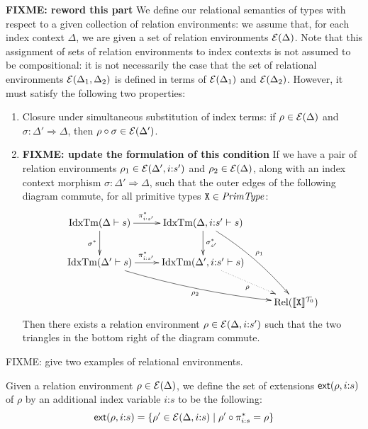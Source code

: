 \textbf{FIXME: reword this part} We define our relational semantics of
types with respect to a given collection of relation environments: we
assume that, for each index context $\Delta$, we are given a set of
relation environments $\mathcal{E}(\Delta)$. Note that this assignment
of sets of relation environments to index contexts is not assumed to
be compositional: it is not necessarily the case that the set of
relational environments $\mathcal{E}(\Delta_1,\Delta_2)$ is defined in
terms of $\mathcal{E}(\Delta_1)$ and $\mathcal{E}(\Delta_2)$. However,
it must satisfy the following two properties:
\begin{enumerate}
\item Closure under simultaneous substitution of index terms: if $\rho
  \in \mathcal{E}(\Delta)$ and $\sigma : \Delta' \Rightarrow \Delta$,
  then $\rho \circ \sigma \in \mathcal{E}(\Delta')$.
\item \textbf{FIXME: update the formulation of this condition} If we
  have a pair of relation environments $\rho_1 \in \mathcal{E}(\Delta',
  i\mathord:s')$ and $\rho_2 \in \mathcal{E}(\Delta)$, along with an
  index context morphism $\sigma : \Delta' \Rightarrow \Delta$, such
  that the outer edges of the following diagram commute, for all
  primitive types $\texttt{X} \in \mathit{PrimType}$:
  \begin{displaymath}
    \xymatrix{
      {\idxTms{\Delta}{s}} \ar[r]^(.45){\pi^*_{i\mathord:s'}} \ar[d]_{\sigma^*}
      &
      {\idxTms{\Delta,i\mathord:s'}{s}} \ar[d]^{\sigma_{s'}^*} \ar@/^/[rdd]^{\rho_1}
      \\
      {\idxTms{\Delta'}{s}} \ar[r]^(.45){\pi^*_{i\mathord:s'}} \ar@/_/[rrd]_{\rho_2}
      &
      {\idxTms{\Delta',i\mathord:s'}{s}} \ar@{.>}[dr]_\rho
      \\
      &
      &
      {\Rel(\tyPrimSem{\tyPrimNm{X}})}
    }
  \end{displaymath}
  Then there exists a relation environment $\rho \in
  \mathcal{E}(\Delta,i\mathord:s')$ such that the two triangles in the
  bottom right of the diagram commute.
\end{enumerate}

\begin{example}
  FIXME: give two examples of relational environments.
\end{example}

Given a relation environment $\rho \in \mathcal{E}(\Delta)$, we define
the set of extensions $\mathsf{ext}(\rho,i\mathord:s)$ of $\rho$ by an
additional index variable $i\mathord:s$ to be the following:
\begin{displaymath}
  \mathsf{ext}(\rho,i\mathord:s) = \{ \rho' \in \mathcal{E}(\Delta,i\mathord:s) \mathrel| \rho' \circ \pi^*_{i\mathord:s} = \rho \}
\end{displaymath}

